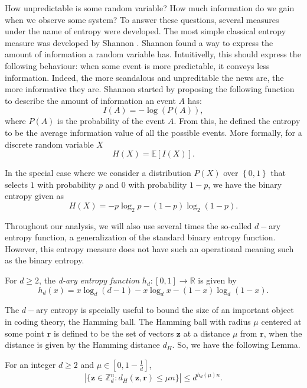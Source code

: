 How unpredictable is some random variable? How much information do we gain when we observe some system? To answer these questions, several measures under the name of entropy were developed. The most simple classical entropy measure was developed by Shannon \cite{S48}. Shannon found a way to express the amount of information a random variable has. Intuitivelly, this should express the following behaviour: when some event is more predictable, it conveys less information. Indeed, the more scandalous and unpreditable the news are, the more informative they are. Shannon started by proposing the following function to describe the amount of information an event $A$ has:
$$I(A) = - \log \left( P(A) \right),$$
where $P(A)$ is the probability of the event $A$. From this, he defined the entropy to be the average information value of all the possible events. More formally, for a discrete random variable $X$
$$H(X) = \mathbb{E}\left[ I(X) \right].$$

In the special case where we consider a distribution $P(X)$ over $\left\{0,1\right\}$ that selects $1$ with probability $p$ and $0$ with probability $1-p$, we have the binary entropy given as
$$H(X) = -p \log_2 p - (1-p)\log_2(1-p).$$

Throughout our analysis, we will also use several times the so-called $d-$ary entropy function, a generalization of the standard binary entropy function. However, this entropy measure does not have such an operational meaning such as the binary entropy.

\begin{definition}
For $d\geq 2$, the \textit{d-ary entropy function} $h_d : [0,1]\rightarrow\mathbb{R}$ is given by
$$h_d(x) = x \log_d(d-1) - x \log_d x - (1-x) \log_d (1-x).$$
\label{def:q-ary}
\end{definition}
The $d-$ary entropy is specially useful to bound the size of an important object in coding theory, the Hamming ball. The Hamming ball with radius $\mu$ centered at some point $\bm{r}$ is defined to be the set of vectors $\bm{z}$ at a distance $\mu$ from $\bm{r}$, when the distance is given by the Hamming distance $d_H$. So, we have the following Lemma.

\begin{lemma}
\label{lemma:hammingBall}
For an integer $d\geq 2$ and $\mu \in [0, 1-\frac{1}{d}]$,
\begin{equation*}
    |\{ \boldsymbol{z}\in \mathbb{Z}_d^{n}: d_H(\boldsymbol{z}, \boldsymbol{r})\leq \mu n \}| \leq d^{h_d(\mu)n}.
\end{equation*}
\end{lemma} 


